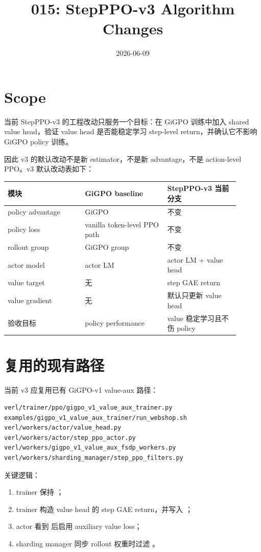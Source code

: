 \documentclass[10pt]{ctexart}
\title{015: StepPPO-v3 Algorithm Changes}
\author{}
\date{2026-06-09}
\begin{document}
\maketitle
\vspace{-1.2em}

\section*{Scope}
当前 StepPPO-v3 的工程改动只服务一个目标：在 GiGPO 训练中加入 shared value head，验证 value head 是否能稳定学习 step-level return，并确认它不影响 GiGPO policy 训练。

因此 v3 的默认改动不是新 estimator，不是新 advantage，不是 action-level PPO。v3 默认改动表如下：
\begin{center}
\begin{tabular}{@{}p{0.30\linewidth}p{0.32\linewidth}p{0.28\linewidth}@{}}
\toprule
模块 & GiGPO baseline & StepPPO-v3 当前分支 \\
\midrule
policy advantage & GiGPO & 不变 \\
policy loss & vanilla token-level PPO path & 不变 \\
rollout group & GiGPO group & 不变 \\
actor model & actor LM & actor LM + value head \\
value target & 无 & step GAE return \\
value gradient & 无 & 默认只更新 value head \\
验收目标 & policy performance & value 稳定学习且不伤 policy \\
\bottomrule
\end{tabular}
\end{center}

\section*{复用的现有路径}
当前 v3 应复用已有 GiGPO-v1 value-aux 路径：
\begin{lstlisting}
verl/trainer/ppo/gigpo_v1_value_aux_trainer.py
examples/gigpo_v1_value_aux_trainer/run_webshop.sh
verl/workers/actor/value_head.py
verl/workers/actor/step_ppo_actor.py
verl/workers/gigpo_v1_value_aux_fsdp_workers.py
verl/workers/sharding_manager/step_ppo_filters.py
\end{lstlisting}

关键逻辑：
\begin{enumerate}
  \item trainer 保持 ；
  \item trainer 构造 value head 的 step GAE return，并写入 ；
  \item actor 看到  后启用 auxiliary value loss；
  \item sharding manager 同步 rollout 权重时过滤 。
\end{enumerate}
\end{document}
